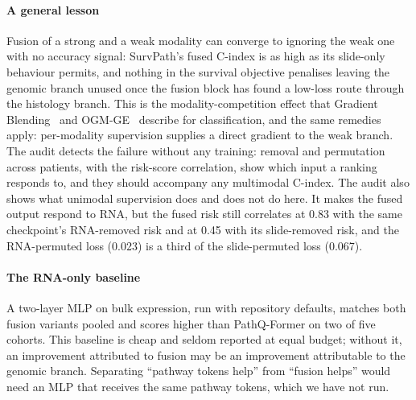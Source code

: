 \documentclass{article}
\newcommand{\pq}{PathQ-Former}
\newcommand{\cindex}{C-index}
\begin{document}
\paragraph{A general lesson} Fusion of a strong and a weak modality can converge to ignoring the weak one with no accuracy signal: SurvPath's fused \cindex{} is as high as its slide-only behaviour permits, and nothing in the survival objective penalises leaving the genomic branch unused once the fusion block has found a low-loss route through the histology branch. This is the modality-competition effect that Gradient Blending~\citep{wang2020gradientblending} and OGM-GE~\citep{peng2022ogmge} describe for classification, and the same remedies apply: per-modality supervision supplies a direct gradient to the weak branch. The audit detects the failure without any training: removal and permutation across patients, with the risk-score correlation, show which input a ranking responds to, and they should accompany any multimodal \cindex{}. The audit also shows what unimodal supervision does and does not do here. It makes the fused output respond to RNA, but the fused risk still correlates at 0.83 with the same checkpoint's RNA-removed risk and at 0.45 with its slide-removed risk, and the RNA-permuted loss (0.023) is a third of the slide-permuted loss (0.067).

\paragraph{The RNA-only baseline} A two-layer MLP on bulk expression, run with repository defaults, matches both fusion variants pooled and scores higher than \pq{} on two of five cohorts. This baseline is cheap and seldom reported at equal budget; without it, an improvement attributed to fusion may be an improvement attributable to the genomic branch. Separating ``pathway tokens help'' from ``fusion helps'' would need an MLP that receives the same pathway tokens, which we have not run.
\end{document}
